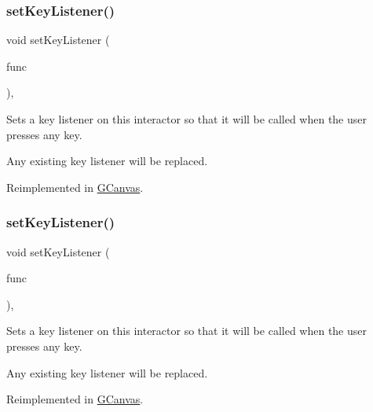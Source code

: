 \subsubsection{\texorpdfstring{set\+Key\+Listener()}{setKeyListener()}\hspace{0.1cm}{\footnotesize\ttfamily [1/2]}}
{\footnotesize\ttfamily void set\+Key\+Listener (\begin{DoxyParamCaption}\item[{G\+Event\+Listener}]{func }\end{DoxyParamCaption})\hspace{0.3cm}{\ttfamily [virtual]}, {\ttfamily [inherited]}}



Sets a key listener on this interactor so that it will be called when the user presses any key. 

Any existing key listener will be replaced. 

Reimplemented in \mbox{\hyperlink{classGCanvas_a53809ec015da5bf9fad5e7a11b218993}{G\+Canvas}}.

\mbox{\label{classGInteractor_ae48ecea73606c7bd9423e1c7cc589cc9}} 
\subsubsection{\texorpdfstring{set\+Key\+Listener()}{setKeyListener()}\hspace{0.1cm}{\footnotesize\ttfamily [2/2]}}
{\footnotesize\ttfamily void set\+Key\+Listener (\begin{DoxyParamCaption}\item[{G\+Event\+Listener\+Void}]{func }\end{DoxyParamCaption})\hspace{0.3cm}{\ttfamily [virtual]}, {\ttfamily [inherited]}}



Sets a key listener on this interactor so that it will be called when the user presses any key. 

Any existing key listener will be replaced. 

Reimplemented in \mbox{\hyperlink{classGCanvas_a1320ed9889a730dfead04a334463ecf3}{G\+Canvas}}.

\mbox{\label{classGInteractor_a04594e8ba9b98513a64f1da00dcae18c}} 
